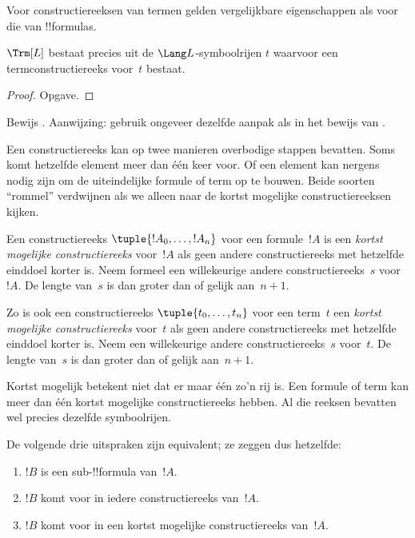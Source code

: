 \documentclass[openany]{memoir}
\begin{document}
Voor constructiereeksen van termen gelden vergelijkbare eigenschappen
als voor die van !!{formula}s.

\begin{prop}
$\Trm[L]$ bestaat precies uit de $\Lang L$-symboolrijen $t$
waarvoor een termconstructiereeks voor~$t$ bestaat.
\end{prop}

\begin{proof}
Opgave.
\end{proof}

\begin{prob}
Bewijs .
Aanwijzing: gebruik ongeveer dezelfde aanpak als in het bewijs van
.
\end{prob}

Een constructiereeks kan op twee manieren overbodige stappen bevatten.
Soms komt hetzelfde element meer dan één keer voor. Of een element kan nergens nodig zijn
om de uiteindelijke formule of term op te bouwen. Beide soorten
``rommel'' verdwijnen als we alleen naar de kortst mogelijke
constructiereeksen kijken.

\begin{defn}
Een constructiereeks $\tuple{!A_0, \ldots, !A_n}$ voor een
formule~$!A$ is een \emph{kortst mogelijke constructiereeks} voor~$!A$
als geen andere constructiereeks met hetzelfde einddoel korter is.
Neem formeel een willekeurige andere constructiereeks~$s$ voor~$!A$.
De lengte van~$s$ is dan groter dan of gelijk aan~$n+1$.

Zo is ook een constructiereeks $\tuple{t_0, \ldots, t_n}$
voor een term~$t$ een \emph{kortst mogelijke constructiereeks}
voor~$t$ als geen andere constructiereeks met hetzelfde einddoel korter
is. Neem een willekeurige andere constructiereeks~$s$ voor~$t$. De
lengte van~$s$ is dan groter dan of gelijk aan~$n+1$.
\end{defn}

Kortst mogelijk betekent niet dat er maar één zo'n rij is. Een formule
of term kan meer dan één kortst mogelijke constructiereeks hebben. Al
die reeksen bevatten wel precies dezelfde symboolrijen.

\begin{prop}
De volgende drie uitspraken zijn equivalent; ze zeggen dus hetzelfde:
\begin{enumerate}
    \item $!B$ is een sub-!!{formula} van~$!A$.
    \item $!B$ komt voor in iedere constructiereeks van~$!A$.
    \item $!B$ komt voor in een kortst mogelijke constructiereeks van~$!A$.
\end{enumerate}
\end{prop}
\end{document}
